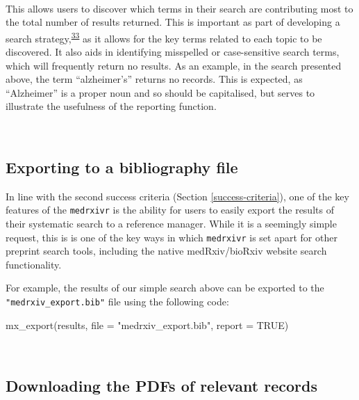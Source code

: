 \documentclass[a4paper, twoside]{templates/ociamthesis}
\newenvironment{Shaded}{\begin{snugshade}}{\end{snugshade}}
\newcommand{\AttributeTok}[1]{\textcolor[rgb]{0.77,0.63,0.00}{#1}}
\newcommand{\ConstantTok}[1]{\textcolor[rgb]{0.00,0.00,0.00}{#1}}
\newcommand{\FunctionTok}[1]{\textcolor[rgb]{0.00,0.00,0.00}{#1}}
\newcommand{\NormalTok}[1]{#1}
\newcommand{\StringTok}[1]{\textcolor[rgb]{0.31,0.60,0.02}{#1}}
\renewenvironment{Shaded}
{
  \vspace{4pt}%
  \begin{snugshade}%
}{%
  \end{snugshade}%
  \vspace{4pt}%
}
\begin{document}
~

This allows users to discover which terms in their search are contributing most to the total number of results returned. This is important as part of developing a search strategy,\textsuperscript{\protect\hyperlink{ref-bramer2018}{33}} as it allows for the key terms related to each topic to be discovered. It also aids in identifying misspelled or case-sensitive search terms, which will frequently return no results. As an example, in the search presented above, the term ``alzheimer's'' returns no records. This is expected, as ``Alzheimer'' is a proper noun and so should be capitalised, but serves to illustrate the usefulness of the reporting function.

~

\hypertarget{exporting-to-a-bibliography-file}{%
\subsection{Exporting to a bibliography file}\label{exporting-to-a-bibliography-file}}

In line with the second success criteria (Section \ref{success-criteria}), one of the key features of the \texttt{medrxivr} is the ability for users to easily export the results of their systematic search to a reference manager. While it is a seemingly simple request, this is is one of the key ways in which \texttt{medrxivr} is set apart for other preprint search tools, including the native medRxiv/bioRxiv website search functionality.

For example, the results of our simple search above can be exported to the \texttt{"medrxiv\_export.bib"} file using the following code:

\begin{Shaded}
\begin{Highlighting}[]
\FunctionTok{mx\_export}\NormalTok{(results, }
          \AttributeTok{file =} \StringTok{"medrxiv\_export.bib"}\NormalTok{,}
          \AttributeTok{report =} \ConstantTok{TRUE}\NormalTok{)}
\end{Highlighting}
\end{Shaded}

~

\hypertarget{downloading-the-pdfs-of-relevant-records}{%
\subsection{Downloading the PDFs of relevant records}\label{downloading-the-pdfs-of-relevant-records}}
\end{document}

